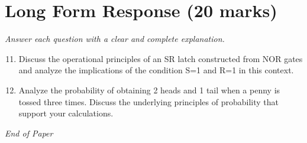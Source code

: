 \documentclass[12pt]{article}
\begin{document}
\section*{Long Form Response (20 marks)}
\textit{Answer each question with a clear and complete explanation.}
\begin{enumerate}[label=\arabic*.]
\setcounter{enumi}{10}
\item Discuss the operational principles of an SR latch constructed from NOR gates and analyze the implications of the condition S=1 and R=1 in this context.
\item Analyze the probability of obtaining 2 heads and 1 tail when a penny is tossed three times. Discuss the underlying principles of probability that support your calculations.
\end{enumerate}

\vfill
\noindent\textit{End of Paper}
\end{document}
